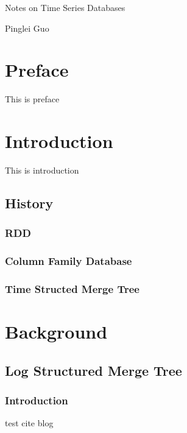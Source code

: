 \documentclass[12pt,a4paper,oneside]{book}
\author{Pinglei Guo}
\date{\today}
\begin{document}
\centerline{\Large{Notes on Time Series Databases}}
\centerline{Pinglei Guo}
\clearpage

\chapter*{Preface}

This is preface

\tableofcontents
\clearpage

\chapter{Introduction}

This is introduction

\section{History}

\subsection{RDD}

\subsection{Column Family Database}

\subsection{Time Structed Merge Tree}

\chapter{Background}

\section{Log Structured Merge Tree}

\subsection{Introduction}

test cite blog\cite{blog:sstable-leveldb}
\end{document}
